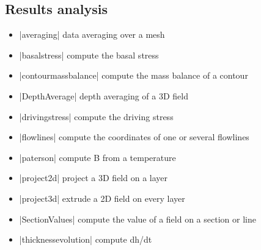 \subsection{Results analysis}
\begin{itemize}
\item \lstinlinebg|averaging| data averaging over a mesh
\item \lstinlinebg|basalstress| compute the basal stress
\item \lstinlinebg|contourmassbalance| compute the mass balance of a contour
\item \lstinlinebg|DepthAverage| depth averaging of a 3D field
\item \lstinlinebg|drivingstress| compute the driving stress
\item \lstinlinebg|flowlines| compute the coordinates of one or several flowlines
\item \lstinlinebg|paterson| compute B from a temperature
\item \lstinlinebg|project2d| project a 3D field on a layer
\item \lstinlinebg|project3d| extrude a 2D field on every layer
\item \lstinlinebg|SectionValues| compute the value of a field on a section or line
\item \lstinlinebg|thicknessevolution| compute dh/dt
\end{itemize}

\clearpage %
